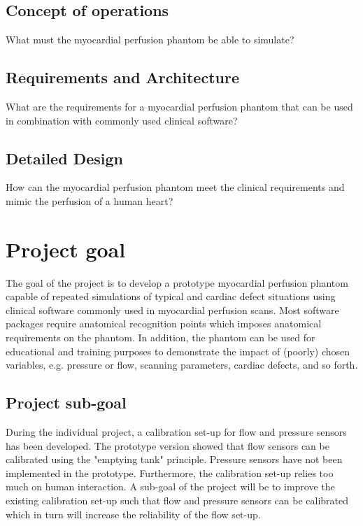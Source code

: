 \subsection*{Concept of operations}
What must the myocardial perfusion phantom be able to simulate?

\subsection*{Requirements and Architecture}
What are the requirements for a myocardial perfusion phantom that can be used in combination with commonly used clinical software?

\subsection*{Detailed Design}
How can the myocardial perfusion phantom meet the clinical requirements and mimic the perfusion of a human heart?

\section{Project goal}
The goal of the project is to develop a prototype myocardial perfusion phantom capable of repeated simulations of typical and cardiac defect situations using clinical software commonly used in myocardial perfusion scans. Most software packages require anatomical recognition points which imposes anatomical requirements on the phantom. In addition, the phantom can be used for educational and training purposes to demonstrate the impact of (poorly) chosen variables, e.g. pressure or flow, scanning parameters, cardiac defects, and so forth.

\subsection*{Project sub-goal}
During the individual project, a calibration set-up for flow and pressure sensors has been developed. The prototype version showed that flow sensors can be calibrated using the "emptying tank" principle. Pressure sensors have not been implemented in the prototype. Furthermore, the calibration set-up relies too much on human interaction. A sub-goal of the project will be to improve the existing calibration set-up such that flow and pressure sensors can be calibrated which in turn will increase the reliability of the flow set-up.
